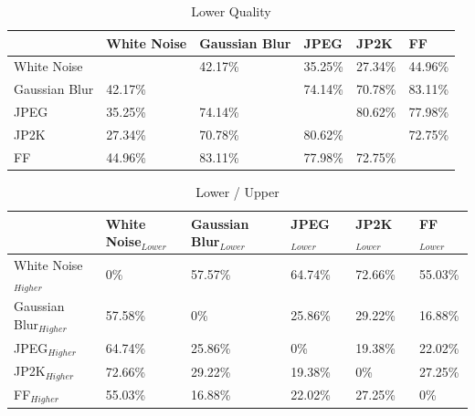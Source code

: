 \begin{table}[h]
\centering
\caption{Lower Quality}
\label{tab:lowcomp}
\begin{tabular}{|l|l|l|l|l|l|}
\hline
              & White Noise    & Gaussian Blur  & JPEG           & JP2K           & FF    \\ \hline
White Noise   &                & 42.17\% & 35.25\% & 27.34\% & 44.96\% \\ \hline
Gaussian Blur & 42.17\% &                & 74.14\%   & 70.78\% & 83.11\% \\ \hline
JPEG          & 35.25\% & 74.14\% &                & 80.62\% & 77.98\% \\ \hline
JP2K          & 27.34\% & 70.78\% & 80.62\% &                & 72.75\% \\ \hline
FF   & 44.96\% & 83.11\% & 77.98\% & 72.75\% &                \\ \hline
\end{tabular}
\end{table}

\begin{table}[]
\centering
\caption{Lower / Upper}
\label{tab:lowhighcomp}
\begin{tabular}{|l|l|l|l|l|l|}
\hline
                    & White Noise$_{Lower}$ & Gaussian Blur$_{Lower}$ & JPEG$_{Lower}$ & JP2K$_{Lower}$ & FF$_{Lower}$ \\ \hline
White Noise$_{Higher}$   & 0\%           & 57.57\%      & 64.74\% & 72.66\% & 55.03\%    \\ \hline
Gaussian Blur$_{Higher}$ & 57.58\%    & 0\%             & 25.86\% & 29.22\% & 16.88\%    \\ \hline
JPEG$_{Higher}$          & 64.74\%    & 25.86\%      & 0\%        & 19.38\% & 22.02\%    \\ \hline
JP2K$_{Higher}$          & 72.66\%    & 29.22\%      & 19.38\% & 0\%        & 27.25\%    \\ \hline
FF$_{Higher}$   & 55.03\%    & 16.88\%      & 22.02\% & 27.25\% & 0\%           \\ \hline
\end{tabular}
\end{table}

